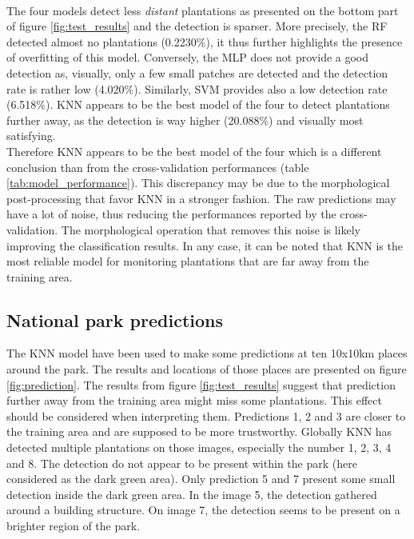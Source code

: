 \documentclass[a4paper, 12pt]{article}
\begin{document}
            \\
            The four models detect less \textit{distant} plantations as presented on the bottom part of figure \ref{fig:test_results} and the detection is sparser. More precisely, the RF detected almost no plantations (0.2230\%), it thus further highlights the presence of overfitting of this model. Conversely, the MLP does not provide a good detection as, visually, only a few small patches are detected and the detection rate is rather low (4.020\%). Similarly, SVM provides also a low detection rate (6.518\%). KNN appears to be the best model of the four to detect plantations further away, as the detection is way higher (20.088\%) and visually most satisfying.
            \\
            Therefore KNN appears to be the best model of the four which is a different conclusion than from the cross-validation performances (table \ref{tab:model_performance}). This discrepancy may be due to the morphological post-processing that favor KNN in a stronger fashion. The raw predictions may have a lot of noise, thus reducing the performances reported by the cross-validation. The morphological operation that removes this noise is likely improving the classification results. In any case, it can be noted that KNN is the most reliable model for monitoring plantations that are far away from the training area.

    \subsection{National park predictions}
        The KNN model have been used to make some predictions at ten 10x10km places around the park. The results and locations of those places are presented on figure \ref{fig:prediction}. The results from figure \ref{fig:test_results} suggest that prediction further away from the training area might miss some plantations. This effect should be considered when interpreting them. Predictions 1, 2 and 3 are closer to the training area and are supposed to be more trustworthy. Globally KNN has detected multiple plantations on those images, especially the number 1, 2, 3, 4 and 8. The detection do not appear to be present within the park (here considered as the dark green area). Only prediction 5 and 7 present some small detection inside the dark green area. In the image 5, the detection gathered around a building structure. On image 7, the detection seems to be present on a brighter region of the park.
\end{document}
